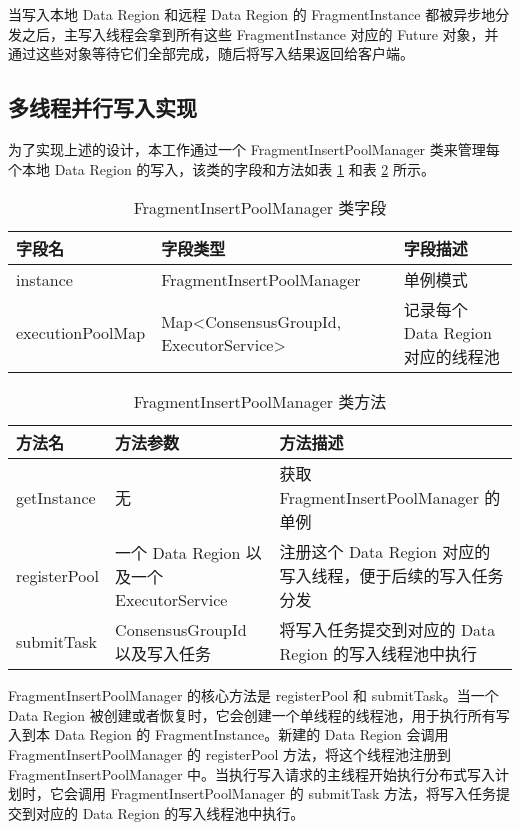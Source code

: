 当写入本地 Data Region 和远程 Data Region 的 FragmentInstance 都被异步地分发之后，主写入线程会拿到所有这些 FragmentInstance 对应的 Future 对象，并通过这些对象等待它们全部完成，随后将写入结果返回给客户端。

\subsection{多线程并行写入实现}
为了实现上述的设计，本工作通过一个 FragmentInsertPoolManager 类来管理每个本地 Data Region 的写入，该类的字段和方法如表 \ref{tabular:fragment-insertion-pool-manager-fields} 和表 \ref{tabular:fragment-insertion-pool-manager-methods} 所示。

\begin{table}
  \centering
  \caption{FragmentInsertPoolManager 类字段}
  \label{tabular:fragment-insertion-pool-manager-fields}
  \begin{tabular}{lp{5cm}p{5cm}}
    \toprule
    字段名 & 字段类型 & 字段描述 \\
    \midrule
    instance & FragmentInsertPoolManager & 单例模式 \\
    executionPoolMap & Map<ConsensusGroupId, ExecutorService> & 记录每个 Data Region 对应的线程池 \\
    \bottomrule
  \end{tabular}
\end{table}

\begin{table}
  \centering
  \caption{FragmentInsertPoolManager 类方法}
  \label{tabular:fragment-insertion-pool-manager-methods}
  \begin{tabular}{lp{5cm}p{5cm}}
    \toprule
    方法名 & 方法参数 & 方法描述 \\
    \midrule
    getInstance & 无 & 获取 FragmentInsertPoolManager 的单例 \\
    registerPool & 一个 Data Region 以及一个 ExecutorService & 注册这个 Data Region 对应的写入线程，便于后续的写入任务分发 \\
    submitTask & ConsensusGroupId 以及写入任务 & 将写入任务提交到对应的 Data Region 的写入线程池中执行 \\
    \bottomrule
  \end{tabular}
\end{table}

FragmentInsertPoolManager 的核心方法是 registerPool 和 submitTask。当一个 Data Region 被创建或者恢复时，它会创建一个单线程的线程池，用于执行所有写入到本 Data Region 的 FragmentInstance。新建的 Data Region 会调用 FragmentInsertPoolManager 的 registerPool 方法，将这个线程池注册到 FragmentInsertPoolManager 中。当执行写入请求的主线程开始执行分布式写入计划时，它会调用 FragmentInsertPoolManager 的 submitTask 方法，将写入任务提交到对应的 Data Region 的写入线程池中执行。

